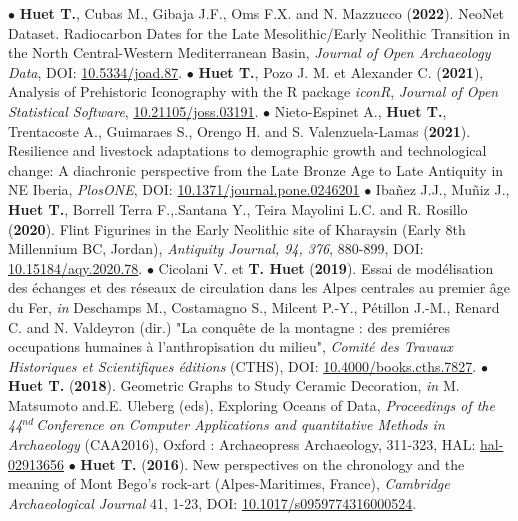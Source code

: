 \documentclass{article}
\begin{document}
\smallbreak
$\bullet$ \textbf{Huet T.}, Cubas M., Gibaja J.F., Oms F.X. and N. Mazzucco (\textbf{2022}). NeoNet Dataset. Radiocarbon Dates for the Late Mesolithic/Early Neolithic Transition in the North Central-Western Mediterranean Basin, \textit{Journal of Open Archaeology Data}, DOI: \href{http://doi.org/10.5334/joad.87}{10.5334/joad.87}.
\smallbreak
$\bullet$ \textbf{Huet T.}, Pozo J. M. et Alexander C. (\textbf{2021}), Analysis of Prehistoric Iconography with the R package \textit{iconR}, \textit{Journal of Open Statistical Software}, \href{https://joss.theoj.org/papers/10.21105/joss.03191}{10.21105/joss.03191}.
\smallbreak
$\bullet$ Nieto-Espinet A., \textbf{Huet T.}, Trentacoste A., Guimaraes S., Orengo H. and S. Valenzuela-Lamas (\textbf{2021}). Resilience and livestock adaptations to demographic growth and technological change: A diachronic perspective from the Late Bronze Age to Late Antiquity in NE Iberia, \textit{PlosONE}, DOI: \href{https://doi.org/10.1371/journal.pone.0246201}{10.1371/journal.pone.0246201}
\smallbreak
$\bullet$ Iba\~{n}ez J.J., Mu\~{n}iz J., \textbf{Huet T.}, Borrell Terra F.,.Santana Y., Teira Mayolini L.C. and R. Rosillo (\textbf{2020}). Flint Figurines in the Early Neolithic site of Kharaysin (Early 8th Millennium BC, Jordan), \textit{Antiquity Journal, 94, 376}, 880-899, DOI: \href{https://doi.org/10.15184/aqy.2020.78}{10.15184/aqy.2020.78}.
\smallbreak
$\bullet$ Cicolani V. et \textbf{T. Huet} (\textbf{2019}). Essai de mod\'{e}lisation des \'{e}changes et des r\'{e}seaux de circulation dans les Alpes centrales au premier \^{a}ge du Fer, \textit{in} Deschamps M., Costamagno S., Milcent P.-Y., Pétillon J.-M., Renard C. and N. Valdeyron (dir.) "La conqu\^{e}te de la montagne : des premi\'{e}res occupations humaines \`{a} l'anthropisation du milieu", \textit{Comit\'{e} des Travaux Historiques et Scientifiques \'{e}ditions} (CTHS), DOI: \href{https://books.openedition.org/cths/7827}{10.4000/books.cths.7827}.
\smallbreak
$\bullet$ \textbf{Huet T.} (\textbf{2018}). Geometric Graphs to Study Ceramic Decoration, \textit{in} M. Matsumoto and.E. Uleberg (eds), Exploring Oceans of Data, \textit{Proceedings of the 44${}^{nd\ }$Conference on Computer Applications and quantitative Methods in Archaeology} (CAA2016), Oxford : Archaeopress Archaeology, 311-323, HAL: \href{https://hal.archives-ouvertes.fr/hal-02913656}{hal-02913656}
\smallbreak
$\bullet$ \textbf{Huet T.} (\textbf{2016}). New perspectives on the chronology and the meaning of Mont Bego's rock-art (Alpes-Maritimes, France), \textit{Cambridge Archaeological Journal} 41, 1-23, DOI: \href{https://doi.org/10.1017/s0959774316000524}{10.1017/s0959774316000524}.
\end{document}
